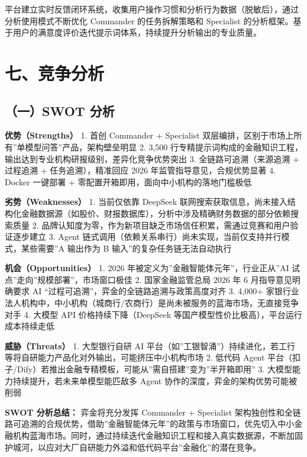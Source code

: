 \documentclass[
]{ctexart}
\begin{document}
平台建立实时反馈闭环系统，收集用户操作习惯和分析行为数据（脱敏后），通过分析使用模式不断优化
Commander 的任务拆解策略和 Specialist
的分析框架。基于用户的满意度评价迭代提示词体系，持续提升分析输出的专业质量。

\section{七、竞争分析}\label{ux4e03ux7adeux4e89ux5206ux6790}

\subsection{（一）SWOT 分析}\label{ux4e00swot-ux5206ux6790}

\textbf{优势（Strengths）} 1. 首创 Commander + Specialist
双层编排，区别于市场上所有''单模型问答''产品，架构壁垒明显 2. 3,500
行专精提示词构成的金融知识工程，输出达到专业机构研报级别，差异化竞争优势突出
3. 全链路可追溯（来源追溯 + 过程追溯 + 任务追溯），精准回应 2026
年监管指导意见，合规优势显著 4. Docker 一键部署 +
零配置开箱即用，面向中小机构的落地门槛极低

\textbf{劣势（Weaknesses）} 1. 当前仅依靠 DeepSeek
联网搜索获取信息，尚未接入结构化金融数据源（如股价、财报数据库），分析中涉及精确财务数据的部分依赖搜索质量
2.
品牌认知度为零，作为新项目缺乏市场信任积累，需通过竞赛和用户验证逐步建立
3. Agent
链式调用（依赖关系串行）尚未实现，当前仅支持并行模式，某些需要''A
输出作为 B 输入''的复杂任务链无法自动执行

\textbf{机会（Opportunities）} 1. 2026
年被定义为''金融智能体元年''，行业正从''AI
试点''走向''规模部署''，市场窗口极佳 2. 国家金融监管总局 2026 年 6
月指导意见明确要求 AI ``过程可追溯''，弈金的全链路追溯与政策高度对齐 3.
4,000+
家银行业法人机构中，中小机构（城商行/农商行）是尚未被服务的蓝海市场，无直接竞争对手
4. 大模型 API 价格持续下降（DeepSeek
等国产模型性价比极高），平台运行成本持续走低

\textbf{威胁（Threats）} 1. 大型银行自研 AI
平台（如''工银智涌''）持续进化，若工行等将自研能力产品化对外输出，可能挤压中小机构市场
2. 低代码 Agent
平台（扣子/Dify）若推出金融专精模板，可能从''需自搭建''变为''半开箱即用''
3. 大模型能力持续提升，若未来单模型能匹敌多 Agent
协作的深度，弈金的架构优势可能被削弱

\textbf{SWOT 分析总结：} 弈金将充分发挥 Commander + Specialist
架构独创性和全链路可追溯的合规优势，借助''金融智能体元年''的政策与市场窗口，优先切入中小金融机构蓝海市场。同时，通过持续迭代金融知识工程和接入真实数据源，不断加固护城河，以应对大厂自研能力外溢和低代码平台''金融化''的潜在竞争。
\end{document}
